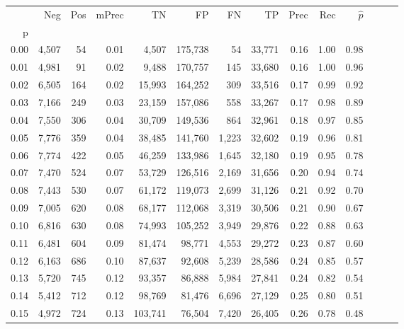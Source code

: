 \begin{tabular}{rrrrrrrrrrrrrr}
\toprule
{} &    Neg &  Pos & mPrec &       TN &       FP &      FN &      TP &  Prec &   Rec & $\hat{p}$ \\
p    &        &      &       &          &          &         &         &       &       &           \\
\midrule
0.00 &  4,507 &   54 &  0.01 &    4,507 &  175,738 &      54 &  33,771 &  0.16 &  1.00 &      0.98 \\
0.01 &  4,981 &   91 &  0.02 &    9,488 &  170,757 &     145 &  33,680 &  0.16 &  1.00 &      0.96 \\
0.02 &  6,505 &  164 &  0.02 &   15,993 &  164,252 &     309 &  33,516 &  0.17 &  0.99 &      0.92 \\
0.03 &  7,166 &  249 &  0.03 &   23,159 &  157,086 &     558 &  33,267 &  0.17 &  0.98 &      0.89 \\
0.04 &  7,550 &  306 &  0.04 &   30,709 &  149,536 &     864 &  32,961 &  0.18 &  0.97 &      0.85 \\
0.05 &  7,776 &  359 &  0.04 &   38,485 &  141,760 &   1,223 &  32,602 &  0.19 &  0.96 &      0.81 \\
0.06 &  7,774 &  422 &  0.05 &   46,259 &  133,986 &   1,645 &  32,180 &  0.19 &  0.95 &      0.78 \\
0.07 &  7,470 &  524 &  0.07 &   53,729 &  126,516 &   2,169 &  31,656 &  0.20 &  0.94 &      0.74 \\
0.08 &  7,443 &  530 &  0.07 &   61,172 &  119,073 &   2,699 &  31,126 &  0.21 &  0.92 &      0.70 \\
0.09 &  7,005 &  620 &  0.08 &   68,177 &  112,068 &   3,319 &  30,506 &  0.21 &  0.90 &      0.67 \\
0.10 &  6,816 &  630 &  0.08 &   74,993 &  105,252 &   3,949 &  29,876 &  0.22 &  0.88 &      0.63 \\
0.11 &  6,481 &  604 &  0.09 &   81,474 &   98,771 &   4,553 &  29,272 &  0.23 &  0.87 &      0.60 \\
0.12 &  6,163 &  686 &  0.10 &   87,637 &   92,608 &   5,239 &  28,586 &  0.24 &  0.85 &      0.57 \\
0.13 &  5,720 &  745 &  0.12 &   93,357 &   86,888 &   5,984 &  27,841 &  0.24 &  0.82 &      0.54 \\
0.14 &  5,412 &  712 &  0.12 &   98,769 &   81,476 &   6,696 &  27,129 &  0.25 &  0.80 &      0.51 \\
0.15 &  4,972 &  724 &  0.13 &  103,741 &   76,504 &   7,420 &  26,405 &  0.26 &  0.78 &      0.48 \\

\end{tabular}

